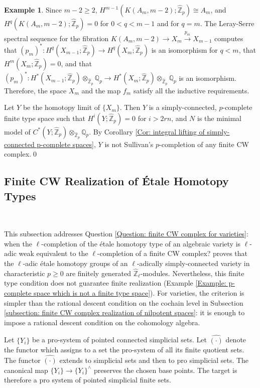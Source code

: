 \documentclass[11pt]{amsart}
\theoremstyle{definition}
\newtheorem{example}[theorem]{Example}
\numberwithin{equation}{section}
\numberwithin{equation}{section}
\newcommand\QQ{\mathbb{Q}}
\newcommand\ZZ{\mathbb{Z}}
\begin{document}
\begin{example}
Since $m-2\geq 2$, $H^{m-1}(K(A_m,m-2);\widehat{\ZZ}_p)\cong A_m$, and $H^q(K(A_m,m-2);\widehat{\ZZ}_p)=0$ for $0<q<m-1$ and for $q=m$. The Leray-Serre spectral sequence for the fibration $K(A_m,m-2)\rightarrow X_{m}\xrightarrow{p_m} X_{m-1}$ computes that $(p_m)^*:H^q(X_{m-1};\widehat{\ZZ}_p)\rightarrow H^q(X_m;\widehat{\ZZ}_p)$ is an isomorphism for $q<m$, that $H^m(X_m;\widehat{\ZZ}_p)=0$, and that $(p_m)^*:H^*(X_{m-1};\widehat{\ZZ}_p)\otimes_{\widehat{\ZZ}_p}\QQ_p\rightarrow H^*(X_m;\widehat{\ZZ}_p)\otimes_{\widehat{\ZZ}_p}\QQ_p$ is an isomorphism. Therefore, the space $X_m$ and the map $f_m$ satisfy all the inductive requirements.

Let $Y$ be the homotopy limit of $\{X_m\}$. Then $Y$ is a simply-connected, $p$-complete finite type space such that $H^i(Y;\widehat{\ZZ}_p)=0$ for $i>2rn$, and $N$ is the minimal model of $C^*(Y;\widehat{\ZZ}_p)\otimes_{\widehat{\ZZ}_p} \QQ_p$. 
By Corollary \ref{Cor: integral lifting of simply-connected p-complete spaces}, $Y$ is not Sullivan's $p$-completion of any finite CW complex.\qed
\end{example}

\subsection{Finite CW Realization of \'Etale Homotopy Types}\,

This subsection addresses Question \ref{Question: finite CW complex for varieties}: when the $\ell$-completion of the \'etale homotopy type of an algebraic variety is $\ell$-adic weak equivalent to the $\ell$-completion of a finite CW complex? \cite{Hu-Zhang-formal-manifold-structures} proves that the $\ell$-adic \'etale homotopy groups of an $\ell$-adically simply-connected variety in characteristic $p\geq 0$ are finitely generated $\widehat{\ZZ}_{\ell}$-modules. Nevertheless, this finite type condition does not guarantee finite realization (Example \ref{Example: p-complete space which is not a finite type space}). For varieties, the criterion is simpler than the rational descent condition on the cochain level in Subsection \ref{subsection: finite CW complex realization of nilpotent spaces}: it is enough to impose a rational descent condition on the cohomology algebra. 

Let $\{Y_i\}$ be a pro-system of pointed connected simplicial sets. Let $\widehat{(\cdot)}$ denote the functor which assigns to a set the pro-system of all its finite quotient sets. The functor $\widehat{(\cdot)}$ extends to simplicial sets and then to pro simplicial sets. The canonical map $\{Y_i\}\rightarrow \{Y_i\}^{\wedge}$ preserves the chosen base points. The target is therefore a pro system of pointed simplicial finite sets.
\end{document}

